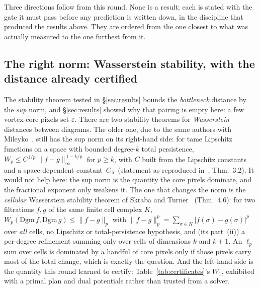 \documentclass[11pt,a4paper]{article}
\begin{document}
Three directions follow from this round. None is a result; each is stated with the gate it must pass
before any prediction is written down, in the discipline that produced the results above. They are
ordered from the one closest to what was actually measured to the one furthest from it.

\subsection{The right norm: Wasserstein stability, with the distance already certified}

The stability theorem tested in \S\ref{sec:results} bounds the \emph{bottleneck} distance by the
\emph{sup} norm, and \S\ref{sec:results} showed why that pairing is empty here: a few vortex-core pixels
set $\varepsilon$. There are two stability theorems for \emph{Wasserstein} distances between diagrams.
The older one, due to the same authors with Mileyko~\cite{CSEHM2010}, still has the sup norm on its
right-hand side: for tame Lipschitz functions on a space with bounded degree-$k$ total persistence,
$W_p \le C^{1/p}\,\|f-g\|_\infty^{\,1-k/p}$ for $p\ge k$, with $C$ built from the Lipschitz constants
and a space-dependent constant~$C_X$ (statement as reproduced in~\cite{SkrabaTurner2020}, Thm.~3.2). It
would not help here: the sup norm is the quantity the core pixels dominate, and the fractional exponent
only weakens it. The one that changes the norm is the \emph{cellular} Wasserstein stability theorem of
Skraba and Turner~\cite{SkrabaTurner2020} (Thm.~4.6): for two filtrations $f,g$ of the same finite cell
complex $K$, $W_p(\mathrm{Dgm}\,f,\mathrm{Dgm}\,g)\le\|f-g\|_p$ with
$\|f-g\|_p^p=\sum_{\sigma\in K}|f(\sigma)-g(\sigma)|^p$ over \emph{all} cells, no Lipschitz or
total-persistence hypothesis, and (its part~(ii)) a per-degree refinement summing only over cells of
dimensions $k$ and $k+1$. An $\ell_p$ sum over cells is dominated by a handful of core pixels only if
those pixels carry most of the total change, which is exactly the question. And the left-hand side is
the quantity this round learned to certify: Table~\ref{tab:certificates}'s $W_1$, exhibited with a
primal plan and dual potentials rather than trusted from a solver.
\end{document}
